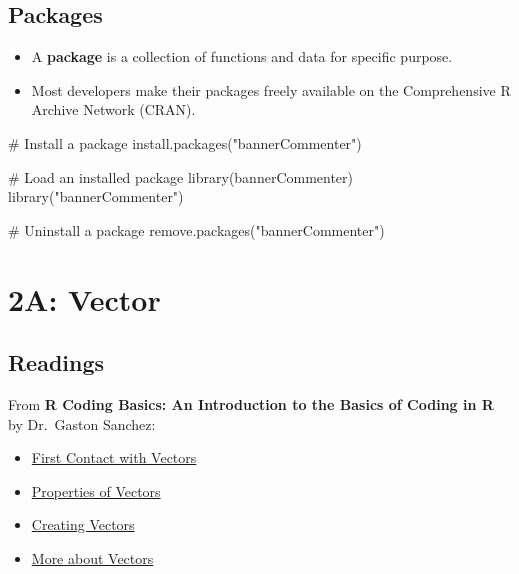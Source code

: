\documentclass[
  letterpaper,
  DIV=11,
  numbers=noendperiod]{scrreprt}
\newenvironment{Shaded}{\begin{snugshade}}{\end{snugshade}}
\newcommand{\CommentTok}[1]{\textcolor[rgb]{0.37,0.37,0.37}{#1}}
\newcommand{\FunctionTok}[1]{\textcolor[rgb]{0.28,0.35,0.67}{#1}}
\newcommand{\NormalTok}[1]{\textcolor[rgb]{0.00,0.23,0.31}{#1}}
\newcommand{\StringTok}[1]{\textcolor[rgb]{0.13,0.47,0.30}{#1}}
\begin{document}
\section{Packages}\label{packages}

\begin{itemize}
\item
  A \textbf{package} is a collection of functions and data for specific
  purpose.
\item
  Most developers make their packages freely available on the
  Comprehensive R Archive Network (CRAN).
\end{itemize}

\begin{Shaded}
\begin{Highlighting}[]
\CommentTok{\# Install a package}
\FunctionTok{install.packages}\NormalTok{(}\StringTok{"bannerCommenter"}\NormalTok{)}

\CommentTok{\# Load an installed package}
\FunctionTok{library}\NormalTok{(bannerCommenter)}
\FunctionTok{library}\NormalTok{(}\StringTok{"bannerCommenter"}\NormalTok{)}

\CommentTok{\# Uninstall a package}
\FunctionTok{remove.packages}\NormalTok{(}\StringTok{"bannerCommenter"}\NormalTok{)}
\end{Highlighting}
\end{Shaded}

\chapter{2A: Vector}\label{a-vector}

\section{Readings}\label{readings}

From \textbf{R Coding Basics: An Introduction to the Basics of Coding in
R} by Dr.~Gaston Sanchez:

\begin{itemize}
\item
  \href{https://www.gastonsanchez.com/R-coding-basics/1-01-vectors-intro.html}{First
  Contact with Vectors}
\item
  \href{https://www.gastonsanchez.com/R-coding-basics/1-02-vectors-properties.html}{Properties
  of Vectors}
\item
  \href{https://www.gastonsanchez.com/R-coding-basics/1-03-vectors-creation.html}{Creating
  Vectors}
\item
  \href{https://www.gastonsanchez.com/R-coding-basics/1-04-vectors-concepts.html}{More
  about Vectors}
\end{itemize}
\end{document}

